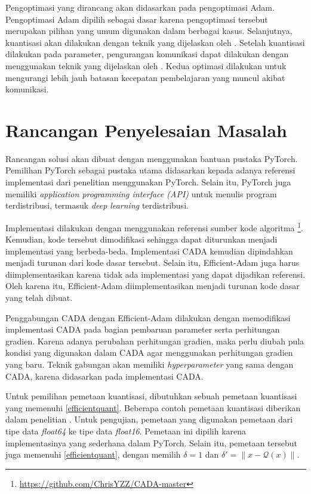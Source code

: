 Pengoptimasi yang dirancang akan didasarkan pada pengoptimasi Adam. Pengoptimasi Adam dipilih sebagai dasar karena pengoptimasi tersebut merupakan pilihan yang umum digunakan dalam berbagai kasus. Selanjutnya, kuantisasi akan dilakukan dengan teknik yang dijelaskan oleh \textcite{Chen2021CADA}. Setelah kuantisasi dilakukan pada parameter, pengurangan komunikasi dapat dilakukan dengan menggunakan teknik yang dijelaskan oleh \textcite{Chen2022Efficient}. Kedua optimasi dilakukan untuk mengurangi lebih jauh batasan kecepatan pembelajaran yang muncul akibat komunikasi.

\section{Rancangan Penyelesaian Masalah}
Rancangan solusi akan dibuat dengan menggunakan bantuan pustaka PyTorch. Pemilihan PyTorch sebagai pustaka utama didasarkan kepada adanya referensi implementasi dari penelitian \textcite{Chen2021CADA} menggunakan PyTorch. Selain itu, PyTorch juga memiliki \emph{application programming interface (API)} untuk menulis program terdistribusi, termasuk \emph{deep learning} terdistribusi.

Implementasi dilakukan dengan menggunakan referensi sumber kode algoritma \textcite{Chen2021CADA}\footnote{\url{https://github.com/ChrisYZZ/CADA-master}}. Kemudian, kode tersebut dimodifikasi sehingga dapat diturunkan menjadi implementasi yang berbeda-beda. Implementasi CADA kemudian dipindahkan menjadi turunan dari kode dasar tersebut. Selain itu, Efficient-Adam juga harus diimplementasikan karena tidak ada implementasi yang dapat dijadikan referensi. Oleh karena itu, Efficient-Adam diimplementasikan menjadi turunan kode dasar yang telah dibuat.

Penggabungan CADA dengan Efficient-Adam dilakukan dengan memodifikasi implementasi CADA pada bagian pembaruan parameter serta perhitungan gradien. Karena adanya perubahan perhitungan gradien, maka perlu diubah pula kondisi yang digunakan dalam CADA agar menggunakan perhitungan gradien yang baru. Teknik gabungan akan memiliki \emph{hyperparameter} yang sama dengan CADA, karena didasarkan pada implementasi CADA.

Untuk pemilihan pemetaan kuantisasi, dibutuhkan sebuah pemetaan kuantisasi yang memenuhi \autoref{efficientquant}. Beberapa contoh pemetaan kuantisasi diberikan dalam penelitian \textcite{Chen2022Efficient}. Untuk pengujian, pemetaan yang digunakan pemetaan dari tipe data \emph{float64} ke tipe data \emph{float16}. Pemetaan ini dipilih karena implementasinya yang sederhana dalam PyTorch. Selain itu, pemetaan tersebut juga memenuhi \autoref{efficientquant}, dengan memilih $\delta = 1$ dan $\delta' = \|x - \mathcal{Q}(x)\|$.
